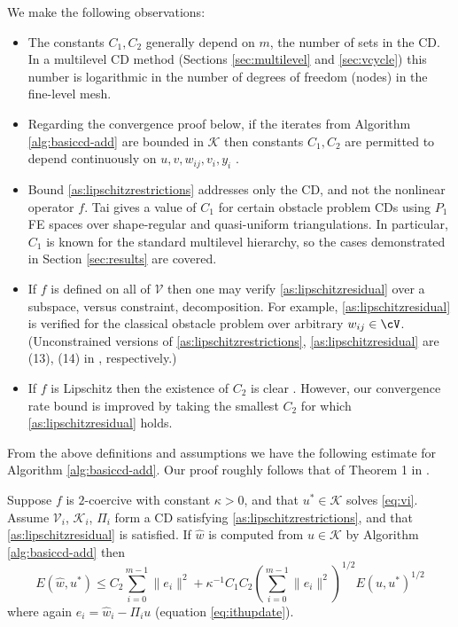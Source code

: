 We make the following observations:
\begin{itemize}
\item The constants $C_1,C_2$ generally depend on $m$, the number of sets in the CD.  In a multilevel CD method (Sections \ref{sec:multilevel} and \ref{sec:vcycle}) this number is logarithmic in the number of degrees of freedom (nodes) in the fine-level mesh.
\item Regarding the convergence proof below, if the iterates from Algorithm \ref{alg:basiccd-add} are bounded in $\mathcal{K}$ then constants $C_1,C_2$ are permitted to depend continuously on $u,v,w_{ij},v_i,y_i$ \cite{Tai2003}.
\item Bound \eqref{as:lipschitzrestrictions} addresses only the CD, and not the nonlinear operator $f$.  Tai \cite{Tai2003} gives a value of $C_1$ for certain obstacle problem CDs using $P_1$ FE spaces over shape-regular and quasi-uniform triangulations.  In particular, $C_1$ is known for the standard multilevel hierarchy, so the cases demonstrated in Section \ref{sec:results} are covered.
\item If $f$ is defined on all of $\mathcal{V}$ then one may verify \eqref{as:lipschitzresidual} over a subspace, versus constraint, decomposition.  For example, \eqref{as:lipschitzresidual} is verified for the classical obstacle problem over arbitrary $w_{ij} \in \cV$.  (Unconstrained versions of \eqref{as:lipschitzrestrictions}, \eqref{as:lipschitzresidual} are (13), (14) in \cite{TaiXu2002}, respectively.)
\item If $f$ is Lipschitz then the existence of $C_2$ is clear \cite{TaiXu2002}.  However, our convergence rate bound is improved by taking the smallest $C_2$ for which \eqref{as:lipschitzresidual} holds.
\end{itemize}

From the above definitions and assumptions we have the following estimate for Algorithm \ref{alg:basiccd-add}.  Our proof roughly follows that of Theorem 1 in \cite{Tai2003}.

\begin{lemma} \label{lem:core}  Suppose $f$ is $2$-coercive with constant $\kappa>0$, and that $u^* \in \mathcal{K}$ solves \eqref{eq:vi}.  Assume $\mathcal{V}_i$, $\mathcal{K}_i$, $\Pi_i$ form a CD satisfying \eqref{as:lipschitzrestrictions}, and that \eqref{as:lipschitzresidual} is satisfied.  If $\hat w$ is computed from $u \in \mathcal{K}$ by Algorithm \ref{alg:basiccd-add} then
\begin{equation}
   E(\hat w,u^*) \le C_2 \sum_{i=0}^{m-1} \|e_i\|^2 + \kappa^{-1} C_1 C_2 \left(\sum_{i=0}^{m-1} \|e_i\|^2\right)^{1/2} E(u,u^*)^{1/2} \label{eq:core}
\end{equation}
where again $e_i=\hat w_i - \Pi_i u$ (equation \eqref{eq:ithupdate}).
\end{lemma}

